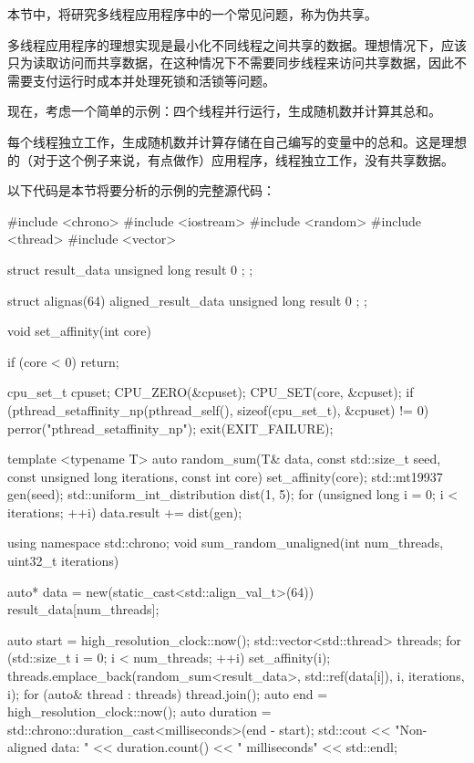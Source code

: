 本节中，将研究多线程应用程序中的一个常见问题，称为伪共享。

多线程应用程序的理想实现是最小化不同线程之间共享的数据。理想情况下，应该只为读取访问而共享数据，在这种情况下不需要同步线程来访问共享数据，因此不需要支付运行时成本并处理死锁和活锁等问题。

现在，考虑一个简单的示例：四个线程并行运行，生成随机数并计算其总和。

每个线程独立工作，生成随机数并计算存储在自己编写的变量中的总和。这是理想的（对于这个例子来说，有点做作）应用程序，线程独立工作，没有共享数据。

以下代码是本节将要分析的示例的完整源代码：

\begin{cpp}
#include <chrono>
#include <iostream>
#include <random>
#include <thread>
#include <vector>

struct result_data {
    unsigned long result { 0 };
};

struct alignas(64) aligned_result_data {
    unsigned long result { 0 };
};

void set_affinity(int core) {
    if (core < 0) {
        return;
    }

    cpu_set_t cpuset;
    CPU_ZERO(&cpuset);
    CPU_SET(core, &cpuset);
    if (pthread_setaffinity_np(pthread_self(), sizeof(cpu_set_t),
    &cpuset) != 0) {
        perror("pthread_setaffinity_np");
        exit(EXIT_FAILURE);
    }
}

template <typename T>
auto random_sum(T& data, const std::size_t seed, const unsigned long
iterations, const int core) {
    set_affinity(core);
    std::mt19937 gen(seed);
    std::uniform_int_distribution dist(1, 5);
    for (unsigned long i = 0; i < iterations; ++i) {
        data.result += dist(gen);
    }
}

using namespace std::chrono;
void sum_random_unaligned(int num_threads, uint32_t iterations) {
    auto* data = new(static_cast<std::align_val_t>(64)) result_data[num_threads];

    auto start = high_resolution_clock::now();
    std::vector<std::thread> threads;
    for (std::size_t i = 0; i < num_threads; ++i) {
        set_affinity(i);
        threads.emplace_back(random_sum<result_data>, std::ref(data[i]), i, iterations, i);
    }
    for (auto& thread : threads) {
        thread.join();
    }
    auto end = high_resolution_clock::now();
    auto duration = std::chrono::duration_cast<milliseconds>(end - start);
    std::cout << "Non-aligned data: " << duration.count() << " milliseconds" << std::endl;

}
\end{cpp}

